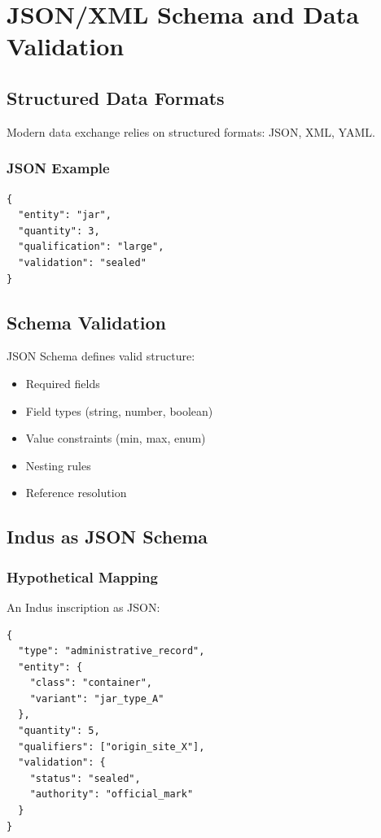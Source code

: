 \section{JSON/XML Schema and Data Validation}

\subsection{Structured Data Formats}

Modern data exchange relies on structured formats: JSON, XML, YAML.

\subsubsection{JSON Example}
\begin{verbatim}
{
  "entity": "jar",
  "quantity": 3,
  "qualification": "large",
  "validation": "sealed"
}
\end{verbatim}

\subsection{Schema Validation}

JSON Schema defines valid structure:
\begin{itemize}
    \item Required fields
    \item Field types (string, number, boolean)
    \item Value constraints (min, max, enum)
    \item Nesting rules
    \item Reference resolution
\end{itemize}

\subsection{Indus as JSON Schema}

\subsubsection{Hypothetical Mapping}
An Indus inscription as JSON:
\begin{verbatim}
{
  "type": "administrative_record",
  "entity": {
    "class": "container",
    "variant": "jar_type_A"
  },
  "quantity": 5,
  "qualifiers": ["origin_site_X"],
  "validation": {
    "status": "sealed",
    "authority": "official_mark"
  }
}
\end{verbatim}

